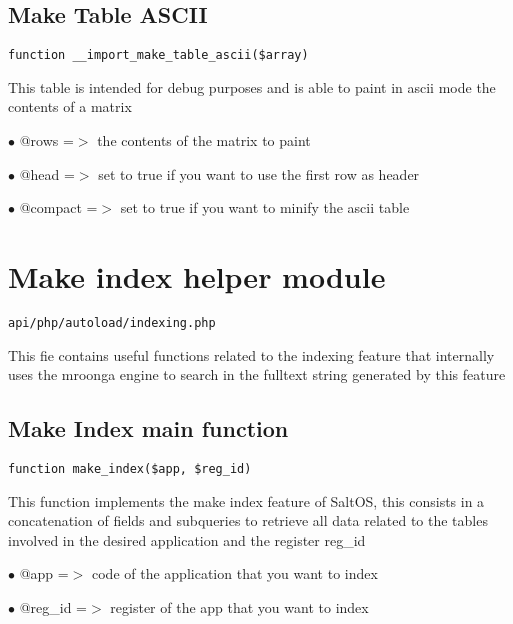 \documentclass[a4paper]{book}
\begin{document}
\hypertarget{toc184}{}
\subsection{Make Table ASCII}

\begin{lstlisting}
function __import_make_table_ascii($array)
\end{lstlisting}

This table is intended for debug purposes and is able to paint in ascii
mode the contents of a matrix

\begin{compactitem}
\item[\color{myblue}$\bullet$] @rows    =$>$ the contents of the matrix to paint
\item[\color{myblue}$\bullet$] @head    =$>$ set to true if you want to use the first row as header
\item[\color{myblue}$\bullet$] @compact =$>$ set to true if you want to minify the ascii table
\end{compactitem}

\hypertarget{toc185}{}
\section{Make index helper module}

\begin{lstlisting}
api/php/autoload/indexing.php
\end{lstlisting}

This fie contains useful functions related to the indexing feature that internally uses the
mroonga engine to search in the fulltext string generated by this feature

\hypertarget{toc186}{}
\subsection{Make Index main function}

\begin{lstlisting}
function make_index($app, $reg_id)
\end{lstlisting}

This function implements the make index feature of SaltOS, this consists
in a concatenation of fields and subqueries to retrieve all data related to
the tables involved in the desired application and the register reg\_id

\begin{compactitem}
\item[\color{myblue}$\bullet$] @app    =$>$ code of the application that you want to index
\item[\color{myblue}$\bullet$] @reg\_id =$>$ register of the app that you want to index
\end{compactitem}
\end{document}
